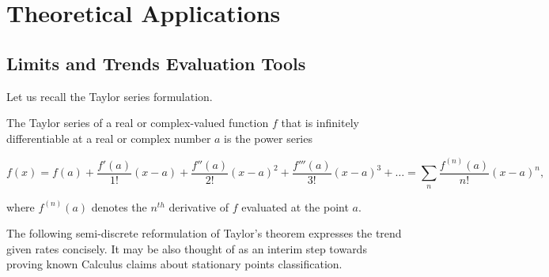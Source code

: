 \documentclass[11pt]{book}
\begin{document}
\section{Theoretical Applications}
\subsection{Limits and Trends Evaluation Tools}

Let us recall the Taylor series formulation.
\begin{theorem}The Taylor series of a real or complex-valued function $f$ that is infinitely differentiable at a real or complex number $a$ is the power series

$$f\left(x\right)=f\left(a\right)+\frac{f'\left(a\right)}{1!}\left(x-a\right)+\frac{f''\left(a\right)}{2!}\left(x-a\right)^{2}+\frac{f'''\left(a\right)}{3!}\left(x-a\right)^{3}+\ldots=\underset{n}{\sum}\frac{f^{\left(n\right)}\left(a\right)}{n!}\left(x-a\right)^{n},$$

where $f^{\left(n\right)}\left(a\right)$ denotes the $n^{th}$ derivative of $f$ evaluated at the point $a$.
\label{taylor_series}
\end{theorem}
The following semi-discrete reformulation of Taylor's theorem expresses the trend given rates concisely. It may be also thought of as an interim step towards proving known Calculus claims about stationary points classification.
\end{document}

